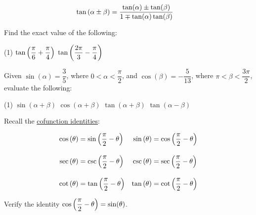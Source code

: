 \documentclass[../mathNotesPreamble]{subfiles}
\begin{document}
  \begin{defn*}
    \begin{align*}
      \tan{\left(\alpha\pm \beta\right)}&= \dfrac{\tan(\alpha) \pm \tan(\beta)}{1\mp \tan(\alpha)\tan(\beta)}
    \end{align*}
  \end{defn*}
  \begin{ex*}
    Find the exact value of the following:
    \begin{extasks}[after-item-skip=\stretch{1}](1)
      \task $\tan{\left(\dfrac{\pi}{6}+\dfrac{\pi}{4}\right)}$
      \task $\tan{\left(\dfrac{2\pi}{3}-\dfrac{\pi}{4}\right)}$
    \end{extasks}
  \end{ex*}
  \pagebreak

  \begin{ex*}
    Given $\sin(\alpha)=\dfrac{3}{5}$, where $0<\alpha<\dfrac{\pi}{2}$, and $\cos(\beta)=-\dfrac{5}{13}$, where $\pi<\beta< \dfrac{3\pi}{2}$, evaluate the following:
    \begin{extasks}[after-item-skip=\stretch{1}](1)
      \task $\sin(\alpha+\beta)$
      \task $\cos(\alpha+\beta)$
      \task $\tan(\alpha+\beta)$
      \task $\tan(\alpha-\beta)$
    \end{extasks}
  \end{ex*}
  \pagebreak

  \noindent
  Recall the \hyperref[defn:cofuncIden]{cofunction identities}:
  \begin{thmBox*}
    \vspace*{-\baselineskip}
    \begin{align*}
      \cos{\left(\theta\right)}&=\sin{\left(\dfrac{\pi}{2}-\theta\right)}&
      \sin{\left(\theta\right)}&=\cos{\left(\dfrac{\pi}{2}-\theta\right)}\\[10pt]
      \sec{\left(\theta\right)}&=\csc{\left(\dfrac{\pi}{2}-\theta\right)}&
      \csc{\left(\theta\right)}&=\sec{\left(\dfrac{\pi}{2}-\theta\right)}\\[10pt]
      \cot{\left(\theta\right)}&=\tan{\left(\dfrac{\pi}{2}-\theta\right)}&
      \tan{\left(\theta\right)}&=\cot{\left(\dfrac{\pi}{2}-\theta\right)}
    \end{align*}
  \end{thmBox*}
  \begin{ex*}
    Verify the identity $\cos{\left(\dfrac{\pi}{2}-\theta\right)}=\sin(\theta)$.
  \end{ex*}
\end{document}
